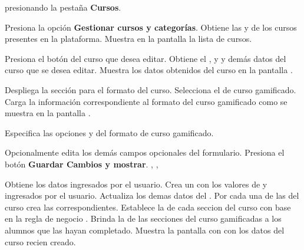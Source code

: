 \begin{UCtrayectoria}%
%
  presionando la pestaña {\bf Cursos}.

  \Actor Presiona la opción {\bf Gestionar cursos y categorías}.
  \Sistema Obtiene las  y 
            de los cursos presentes en la plataforma.
  \Sistema Muestra en la pantalla  la lista de cursos.
           \label{CU-E05-course-list}

  \Actor Presiona el botón \IUConfigurar del curso que desea editar.
  \Sistema Obtiene el ,  y
            y demás datos del curso que se desea editar.
  \Sistema Muestra los datos obtenidos del curso en la pantalla .


  \Actor Despliega la sección para el formato del curso.
  \Actor Selecciona el  de curso gamificado.
  \Sistema Carga la información correspondiente al formato del curso gamificado
           como se muestra en la pantalla .

  \Actor Especifica las opciones  y
          del formato de curso gamificado. 

  \Actor Opcionalmente edita los demás campos opcionales del formulario.
  \Actor Presiona el botón {\bf Guardar Cambios y mostrar}. , ,
          \label{CU-E05-submit}

  \Sistema Obtiene los datos ingresados por el usuario.
  \Sistema Crea un  con los valores de  
           y  ingresados por el usuario.
  \Sistema Actualiza los demas datos del .
  \Sistema Por cada una de las  del curso crea las
            correspondientes.
  \Sistema Establece la  de cada seccion del curso con base 
           en la regla de negocio .
  \Sistema Brinda la  de las secciones del curso
           gamificadas a los alumnos que las hayan completado. \label{CU-E05-finish}
  \Sistema Muestra la pantalla con  con los datos del curso recien
           creado.

\end{UCtrayectoria}

